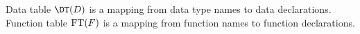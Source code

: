 Data table $\DT(D)$ is a mapping from data type names to data declarations. Function table $\operatorname{FT}(F)$ is a mapping from function names to function declarations.
\begin{defbox}

\end{defbox}
